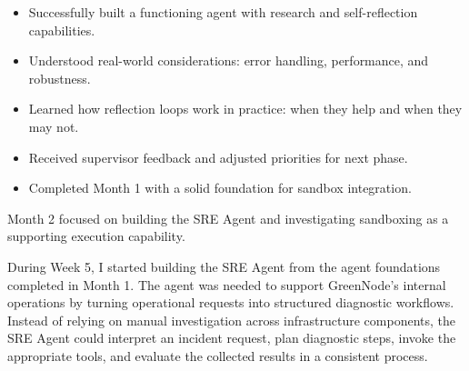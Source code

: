 
\begin{itemize}
    \item Successfully built a functioning agent with research and self-reflection capabilities.
    \item Understood real-world considerations: error handling, performance, and robustness.
    \item Learned how reflection loops work in practice: when they help and when they may not.
    \item Received supervisor feedback and adjusted priorities for next phase.
    \item Completed Month 1 with a solid foundation for sandbox integration.
\end{itemize}

\newpage

{}

Month 2 focused on building the SRE Agent and investigating sandboxing as a supporting execution capability.


During Week 5, I started building the SRE Agent from the agent foundations completed in Month 1. The agent was needed to support GreenNode's internal operations by turning operational requests into structured diagnostic workflows. Instead of relying on manual investigation across infrastructure components, the SRE Agent could interpret an incident request, plan diagnostic steps, invoke the appropriate tools, and evaluate the collected results in a consistent process.


